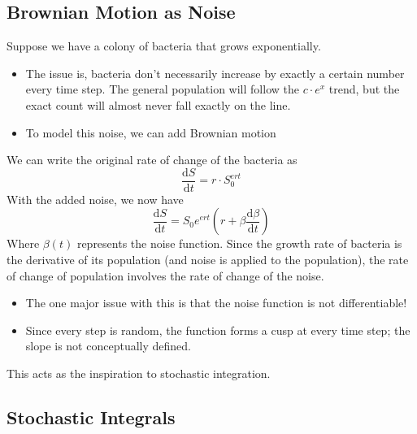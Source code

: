 \documentclass[10pt]{article}
\newcommand{\dd}{\text{d}}
\begin{document}
\subsection*{Brownian Motion as Noise}
Suppose we have a colony of bacteria that grows exponentially.  
\begin{itemize}
	\item The issue is, bacteria don't necessarily increase by exactly a certain number every time step.  The general population will follow the $c \cdot e^x$ trend, but the exact count will almost never fall exactly on the line.
	\item To model this noise, we can add Brownian motion
\end{itemize}
We can write the original rate of change of the bacteria as
\[\frac{\dd S}{\dd t} = r \cdot S_0^{ert}\]
With the added noise, we now have
\[\frac{\dd S}{\dd t} = S_0 e^{ert} \left(r + \beta \frac{\dd \beta}{\dd t}\right)\]
Where $\beta(t)$ represents the noise function.  Since the growth rate of bacteria is the derivative of its population (and noise is applied to the population), the rate of change of population involves the rate of change of the noise.
\begin{itemize}
	\item The one major issue with this is that the noise function is not differentiable!
	\item Since every step is random, the function forms a cusp at every time step; the slope is not conceptually defined.
\end{itemize}
This acts as the inspiration to stochastic integration.

\subsection*{Stochastic Integrals}
\end{document}
